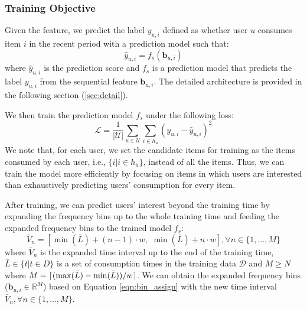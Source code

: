 \documentclass[sigconf]{acmart}
\DeclarePairedDelimiter\ceil{\lceil}{\rceil}
\begin{document}
\subsubsection{\textbf{Training Objective}}
Given the feature, we predict the label $y_{u,i}$ defined as whether user $u$ consumes item $i$ in the recent period with a prediction model such that:
\begin{equation*}
     \hat{y}_{u,i} = f_s(\textbf{b}_{u,i}) 
\end{equation*}
where $\hat{y}_{u,i}$ is the prediction score and $f_s$ is a prediction model that predicts the label $y_{u,i}$ from the sequential feature $\textbf{b}_{u,i}$. The detailed architecture is provided in the following section (\cref{sec:detail}).

We then train the prediction model $f_s$ under the following loss:
\begin{equation}
     \mathcal{L} = \frac{1}{|\mathcal{U}|} \sum_{u\in \mathcal{U}} \sum_{i\in h_u} (y_{u,i} - \hat{y}_{u,i})^2
     \label{eqn:l2loss}
\end{equation}
We note that, for each user, we set the candidate items for training as the items consumed by each user, i.e., $\{i| i\in h_u\}$, instead of all the items. Thus, we can train the model more efficiently by focusing on items in which users are interested than exhaustively predicting users' consumption for every item.

After training, we can predict users' interest beyond the training time by expanding the frequency bins up to the whole training time and feeding the expanded frequency bins to the trained model $f_s$:
\begin{equation*}
    \bar{V}_n=[\min(\bar{L}) + (n-1)\cdot w, \,\, \min(\bar{L}) + n \cdot w], \forall n \in\{1,...,M\}
\end{equation*}
where $\bar{V}_n$ is the expanded time interval up to the end of the training time, $\bar{L} \in \{t|t\in D\}$ is a set of consumption times in the training data $\mathcal{D}$ and $M \ge N$ where $M = \ceil{(\max(\bar{L}) - \min(\bar{L}))/w}$. We can obtain the expanded frequency bins ($\textbf{b}_{u,i} \in \mathbb{R}^M$) based on Equation \ref{eqn:bin_assign} with the new time interval $\bar{V}_n, \forall n \in \{1,...,M\}$.
\end{document}
